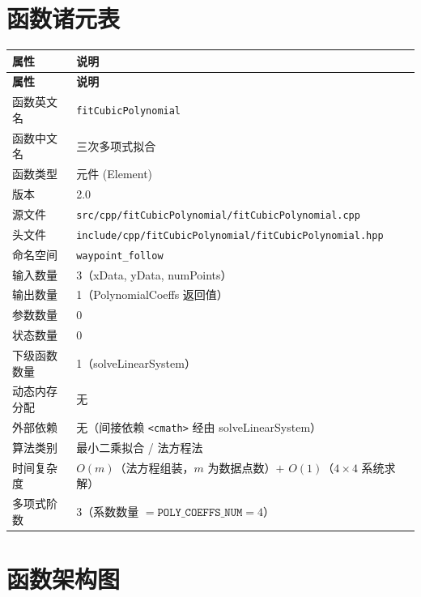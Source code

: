 \documentclass[a4paper,10pt]{article}
\begin{document}
\section{函数诸元表}

\renewcommand{\arraystretch}{1.3}
\begin{longtable}{|L{3.8cm}|L{11.5cm}|}
\hline
\textbf{属性} & \textbf{说明} \\
\hline
\endfirsthead
\hline
\textbf{属性} & \textbf{说明} \\
\hline
\endhead
函数英文名 & \texttt{fitCubicPolynomial} \\
\hline
函数中文名 & 三次多项式拟合 \\
\hline
函数类型 & 元件 (Element) \\
\hline
版本 & 2.0 \\
\hline
源文件 & \texttt{src/cpp/fitCubicPolynomial/fitCubicPolynomial.cpp} \\
\hline
头文件 & \texttt{include/cpp/fitCubicPolynomial/fitCubicPolynomial.hpp} \\
\hline
命名空间 & \texttt{waypoint\_follow} \\
\hline
输入数量 & 3（xData, yData, numPoints） \\
\hline
输出数量 & 1（PolynomialCoeffs 返回值） \\
\hline
参数数量 & 0 \\
\hline
状态数量 & 0 \\
\hline
下级函数数量 & 1（solveLinearSystem） \\
\hline
动态内存分配 & 无 \\
\hline
外部依赖 & 无（间接依赖 \texttt{<cmath>} 经由 solveLinearSystem） \\
\hline
算法类别 & 最小二乘拟合 / 法方程法 \\
\hline
时间复杂度 & $O(m)$（法方程组装，$m$ 为数据点数）$+$ $O(1)$（$4{\times}4$ 系统求解） \\
\hline
多项式阶数 & 3（系数数量 $= \texttt{POLY\_COEFFS\_NUM} = 4$） \\
\hline
\end{longtable}

\section{函数架构图}
\end{document}
